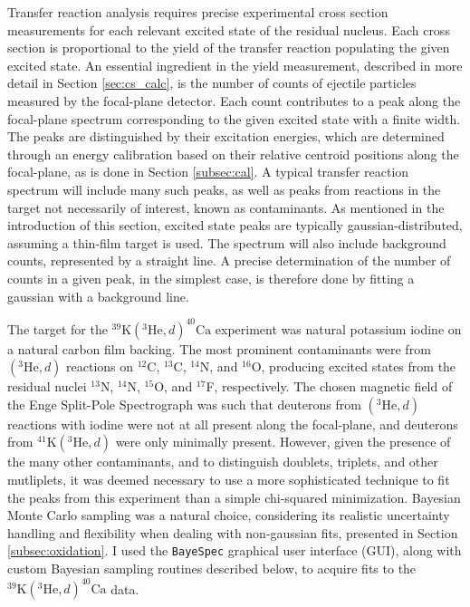 Transfer reaction analysis requires precise experimental cross section measurements for each relevant excited state of the residual nucleus. Each cross section is proportional to the yield of the transfer reaction populating the given excited state. An essential ingredient in the yield measurement, described in more detail in Section \ref{sec:cs_calc}, is the number of counts of ejectile particles measured by the focal-plane detector. Each count contributes to a peak along the focal-plane spectrum corresponding to the given excited state with a finite width. The peaks are distinguished by their excitation energies, which are determined through an energy calibration based on their relative centroid positions along the focal-plane, as is done in Section \ref{subsec:cal}. A typical transfer reaction spectrum will include many such peaks, as well as peaks from reactions in the target not necessarily of interest, known as contaminants. As mentioned in the introduction of this section, excited state peaks are typically gaussian-distributed, assuming a thin-film target is used. The spectrum will also include background counts, represented by a straight line. A precise determination of the number of counts in a given peak, in the simplest case, is therefore done by fitting a gaussian with a background line.

The target for the $^{39}\mathrm{K}(^{3}\mathrm{He}, d)^{40}\mathrm{Ca}$ experiment was natural potassium iodine on a natural carbon film backing. The most prominent contaminants were from $(^{3}\mathrm{He}, d)$ reactions on $^{12}$C, $^{13}$C, $^{14}$N, and $^{16}$O, producing excited states from the residual nuclei $^{13}$N, $^{14}$N, $^{15}$O, and $^{17}$F, respectively. The chosen magnetic field of the Enge Split-Pole Spectrograph was such that deuterons from $(^{3}\mathrm{He}, d)$ reactions with iodine were not at all present along the focal-plane, and deuterons from $^{41}\mathrm{K}(^{3}\mathrm{He}, d)$ were only minimally present. However, given the presence of the many other contaminants, and to distinguish doublets, triplets, and other mutliplets, it was deemed necessary to use a more sophisticated technique to fit the peaks from this experiment than a simple chi-squared minimization. Bayesian Monte Carlo sampling was a natural choice, considering its realistic uncertainty handling and flexibility when dealing with non-gaussian fits, presented in Section \ref{subsec:oxidation}. I used the \texttt{BayeSpec} \cite{BayeSpec} graphical user interface (GUI), along with custom Bayesian sampling routines described below, to acquire fits to the $^{39}\mathrm{K}(^{3}\mathrm{He}, d)^{40}\mathrm{Ca}$ data.

